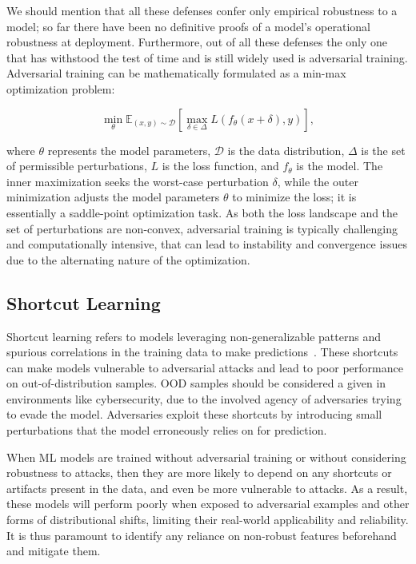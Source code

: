 We should mention that all these defenses confer only empirical robustness to a model; so far there have been no definitive proofs of a model's operational robustness at deployment.
Furthermore, out of all these defenses the only one that has withstood the test of time and is still widely used is adversarial training.
Adversarial training can be mathematically formulated as a min-max optimization problem:

\begin{equation}
\min_{\theta} \mathbb{E}_{(x,y) \sim \mathcal{D}} \left[ \max_{\delta \in \Delta} L(f_\theta(x + \delta), y) \right],
\end{equation}

where \( \theta \) represents the model parameters, \( \mathcal{D} \) is the data distribution, \( \Delta \) is the set of permissible perturbations, \( L \) is the loss function, and \( f_\theta \) is the model.
The inner maximization seeks the worst-case perturbation \( \delta \), while the outer minimization adjusts the model parameters \( \theta \) to minimize the loss; it is essentially a saddle-point optimization task.
As both the loss landscape and the set of perturbations are non-convex, adversarial training is typically challenging and computationally intensive, that can lead to instability and convergence issues due to the alternating nature of the optimization.

\subsection{Shortcut Learning}

Shortcut learning refers to models leveraging non-generalizable patterns and spurious correlations in the training data to make predictions~\cite{geirhos2020shortcut}.
These shortcuts can make models vulnerable to adversarial attacks and lead to poor performance on out-of-distribution samples.
\gls{OOD} samples should be considered a given in environments like cybersecurity, due to the involved agency of adversaries trying to evade the model.
Adversaries exploit these shortcuts by introducing small perturbations that the model erroneously relies on for prediction.

When \gls{ML} models are trained without adversarial training or without considering robustness to attacks, then they are more likely to depend on any shortcuts or artifacts present in the data, and even be more vulnerable to attacks.
As a result, these models will perform poorly when exposed to adversarial examples and other forms of distributional shifts, limiting their real-world applicability and reliability.
It is thus paramount to identify any reliance on non-robust features beforehand and mitigate them.

